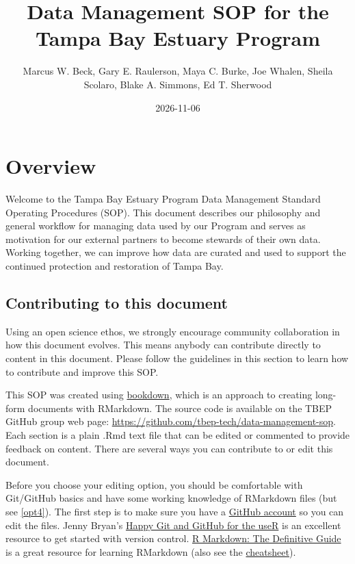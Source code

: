 \documentclass[
]{book}
\title{Data Management SOP for the Tampa Bay Estuary Program}
\author{Marcus W. Beck, Gary E. Raulerson, Maya C. Burke, Joe Whalen, Sheila Scolaro, Blake A. Simmons, Ed T. Sherwood}
\date{2026-11-06}
\begin{document}
\maketitle

{
\setcounter{tocdepth}{1}
\tableofcontents
}
\chapter{Overview}\label{overview}

Welcome to the Tampa Bay Estuary Program Data Management Standard Operating Procedures (SOP). This document describes our philosophy and general workflow for managing data used by our Program and serves as motivation for our external partners to become stewards of their own data. Working together, we can improve how data are curated and used to support the continued protection and restoration of Tampa Bay.

\section{Contributing to this document}\label{contrib}

Using an open science ethos, we strongly encourage community collaboration in how this document evolves. This means anybody can contribute directly to content in this document. Please follow the guidelines in this section to learn how to contribute and improve this SOP.

This SOP was created using \href{https://bookdown.org/}{bookdown}, which is an approach to creating long-form documents with RMarkdown. The source code is available on the TBEP GitHub group web page: \url{https://github.com/tbep-tech/data-management-sop}. Each section is a plain .Rmd text file that can be edited or commented to provide feedback on content. There are several ways you can contribute to or edit this document.

Before you choose your editing option, you should be comfortable with Git/GitHub basics and have some working knowledge of RMarkdown files (but see \ref{opt4}). The first step is to make sure you have a \href{https://github.com/join}{GitHub account} so you can edit the files. Jenny Bryan's \href{https://happygitwithr.com/}{Happy Git and GitHub for the useR} is an excellent resource to get started with version control. \href{https://bookdown.org/yihui/rmarkdown/}{R Markdown: The Definitive Guide} is a great resource for learning RMarkdown (also see the \href{https://rstudio.com/wp-content/uploads/2015/03/rmarkdown-reference.pdf}{cheatsheet}).
\end{document}
